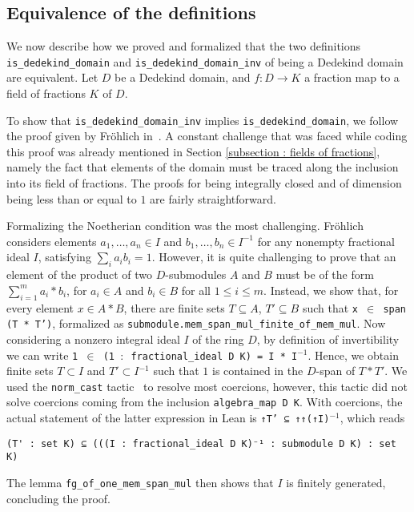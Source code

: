 \documentclass[sn-mathphys]{sn-jnl}%
\newcommand{\inv}{\ensuremath{{}^{-1}}}
\newcommand{\lean}[1]{\texttt{#1}\xspace}
\begin{document}
\subsection{Equivalence of the definitions} \label{sec:equivalence}
We now describe how we proved and formalized that the two definitions \lean{is\_dedekind\_domain} and \lean{is\_dedekind\_domain\_inv} of being a Dedekind domain are equivalent. Let $D$ be a Dedekind domain, and $f\colon D\to K$ a fraction map to a field of fractions $K$ of $D$.

To show that \lean{is\_dedekind\_domain\_inv} implies \lean{is\_dedekind\_domain}, we follow the proof given by Fr\"ohlich in~\cite[Chapter 1, Section~2, Proposition~1.2.1]{frohlich}. A constant challenge that was faced while coding this proof was already mentioned in Section \ref{subsection : fields of fractions}, namely the fact that elements of the domain must be traced along the inclusion into its field of fractions.
The proofs for being integrally closed and of dimension being less than or equal to $1$ are fairly straightforward.

Formalizing the Noetherian condition was the most challenging. Fr\"ohlich considers elements $a_1, \dots, a_n \in I$ and $b_1, \dots, b_n \in I^{-1}$ for any nonempty fractional ideal $I$,
satisfying $ \sum_i a_i b_i = 1 $.
However, it is quite challenging to prove that an element of the product of two $D$-submodules $A$ and $B$ must be of the form $\sum_{i = 1}^m a_i*b_i$, for $a_i \in A$ and $b_i \in B$ for all $1 \leq i \leq m$.
Instead, we show that, for every element $x\in A\ast B$, there are finite sets $T\subseteq A$, $T'\subseteq B$ such that \lean{x $\in$ span (T * T')}, formalized as
\lean{submodule.mem\_span\_mul\_finite\-\_of\-\_mem\-\_mul}.
Now considering a nonzero integral ideal $I$ of the ring $D$, by definition of invertibility we can write \lean{1 $\in$ (1 $:$ fractional\_ideal D K) = I * I\inv}. Hence, we obtain 
finite sets $T \subset I$ and $T' \subset I\inv$ such that $1$ is contained in the $D$-span of $T*T'$. We used the \lean{norm\_cast} tactic~\cite{norm_cast} to resolve most coercions, however, this tactic did not solve coercions coming from the inclusion \lean{algebra\_map D K}. With coercions, the actual statement of the latter expression in Lean is \lean{↑T' ⊆ ↑↑(↑I)\inv}, which reads
\begin{lstlisting}
(T' : set K) ⊆ (((I : fractional_ideal D K)⁻¹ : submodule D K) : set K)
\end{lstlisting}
The lemma \lean{fg\_of\_one\_mem\_span\_mul} then shows that $I$ is finitely generated, concluding the proof.
\end{document}
